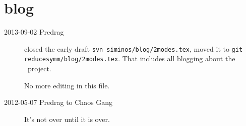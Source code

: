 

    \chapter{{\twoMode} blog}
    \label{chap:2modes}

\begin{description}
\item[2013-09-02 Predrag] closed the early draft
  \texttt{svn siminos/blog/2modes.tex}, moved it to
  \texttt{git reducesymm/blog/2modes.tex}. That includes
  all blogging about the \twomode\ project.

No more editing in this file.

\item[2012-05-07  Predrag to Chaos Gang] It's not over until it is over.
\end{description}

